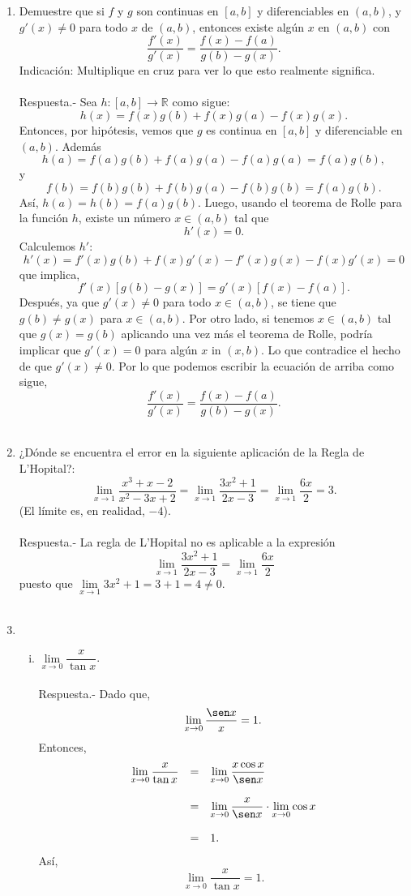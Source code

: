 \begin{enumerate}[\bfseries 1.]
    \item Demuestre que si $f$ y $g$ son continuas en $[a,b]$ y diferenciables en $(a,b)$, y $g'(x)\neq 0$ para todo $x$ de $(a,b)$, entonces existe algún $x$ en $(a,b)$ con
    $$\dfrac{f'(x)}{g'(x)}=\dfrac{f(x)-f(a)}{g(b)-g(x)}.$$
    Indicación: Multiplique en cruz para ver lo que esto realmente significa.\\\\
	Respuesta.-\; Sea $h:[a,b]\to \mathbb{R}$ como sigue:
	$$h(x)=f(x)g(b)+f(x)g(a)-f(x)g(x).$$
	Entonces, por hipótesis, vemos que $g$ es continua en $[a,b]$ y diferenciable en $(a,b)$. Además
	$$h(a)=f(a)g(b)+f(a)g(a)-f(a)g(a)=f(a)g(b),$$
	y
	$$f(b)=f(b)g(b)+f(b)g(a)-f(b)g(b)=f(a)g(b).$$
	Así, $h(a)=h(b)=f(a)g(b)$. Luego, usando el teorema de Rolle para la función $h$, existe un número $x\in (a,b)$ tal que
	$$h'(x)=0.$$
	Calculemos $h'$:
	$$h'(x)=f'(x)g(b)+f(x)g'(x)-f'(x)g(x)-f(x)g'(x)=0$$
	que implica,
	$$f'(x)[g(b)-g(x)]=g'(x)[f(x)-f(a)].$$
	Después, ya que $g'(x)\neq 0$ para todo $x\in (a,b)$, se tiene que $g(b)\neq g(x)$ para $x\in (a,b)$. Por otro lado, si tenemos $x\in (a,b)$ tal que $g(x)=g(b)$ aplicando una vez más el teorema de Rolle, podría implicar que $g'(x)=0$ para algún $x$ in $(x,b)$. Lo que contradice el hecho de que $g'(x)\neq 0$. Por lo que podemos escribir la ecuación de arriba como sigue,
	$$\dfrac{f'(x)}{g'(x)}=\dfrac{f(x)-f(a)}{g(b)-g(x)}.$$\\


    \item ¿Dónde se encuentra el error en la siguiente aplicación de la Regla de L'Hopital?:
    $$\lim_{x\to 1}\dfrac{x^3+x-2}{x^2-3x+2}=\lim_{x\to 1}\dfrac{3x^2+1}{2x-3}=\lim_{x\to 1}\dfrac{6x}{2}=3.$$
    (El límite es, en realidad, $-4$).\\\\
	Respuesta.-\; La regla de L'Hopital no es aplicable a la expresión
	$$\lim_{x\to 1}\dfrac{3x^2+1}{2x-3}=\lim_{x\to 1}\dfrac{6x}{2}$$
	puesto que $\lim\limits_{x\to 1}3x^2+1=3+1=4\neq 0$.\\\\

    \item 
	\begin{enumerate}[(i)]

	    \item $\lim\limits_{x\to 0}\dfrac{x}{\tan x}$.\\\\
		Respuesta.-\; Dado que,
		$$\lim_{x\to 0}\dfrac{\sen x}{x}=1.$$
		Entonces,
		$$
		\begin{array}{rcl}
		    \lim\limits_{x\to 0} \dfrac{x}{\tan x} &=& \lim\limits_{x\to 0} \dfrac{x\cos x}{\sen x}\\\\
							   &=& \lim\limits_{x\to 0} \dfrac{x}{\sen x}\cdot \lim\limits_{x\to 0}\cos x\\\\
							   &=& 1.
		\end{array}
		$$
		Así, 
		$$\lim_{x\to 0}\dfrac{x}{\tan x}=1.$$\\


\end{enumerate}
\end{enumerate}
